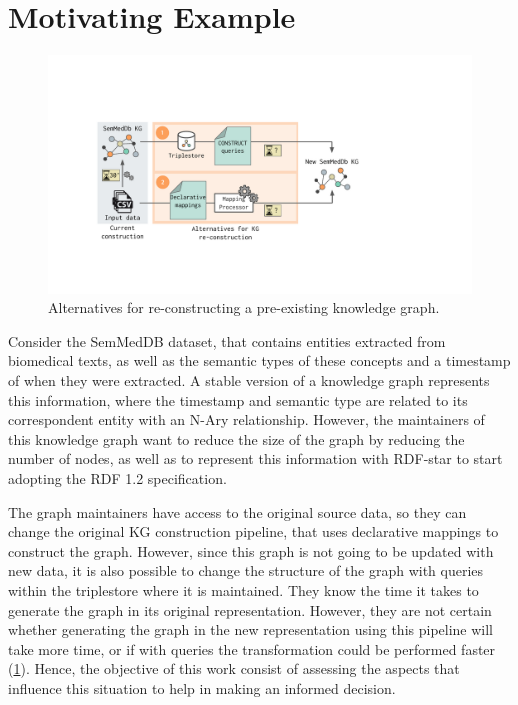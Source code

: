 
\section{Motivating Example}
\label{sec:chp6-1_mot-example}


\begin{figure}[t!]
    \centering
    \includegraphics[width=1\linewidth]{figures/chp6-1_motivating-example.pdf}
    \caption[KG re-construcion alternatives]{Alternatives for re-constructing a pre-existing knowledge graph.}
    \label{fig:chp6-1_mot-example}
\end{figure}

Consider the SemMedDB dataset, that contains entities extracted from biomedical texts, as well as the semantic types of these concepts and a timestamp of when they were extracted. A stable version of a knowledge graph represents this information, where the timestamp and semantic type are related to its correspondent entity with an N-Ary relationship. However, the maintainers of this knowledge graph want to reduce the size of the graph by reducing the number of nodes, as well as to represent this information with RDF-star to start adopting the RDF 1.2 specification.

The graph maintainers have access to the original source data, so they can change the original KG construction pipeline, that uses declarative mappings to construct the graph. However, since this graph is not going to be updated with new data, it is also possible to change the structure of the graph with queries within the triplestore where it is maintained. They know the time it takes to generate the graph in its original representation. However, they are not certain whether generating the graph in the new representation using this pipeline will take more time, or if with queries the transformation could be performed faster (\cref{fig:chp6-1_mot-example}). Hence, the objective of this work consist of assessing the aspects that influence this situation to help in making an informed decision.



